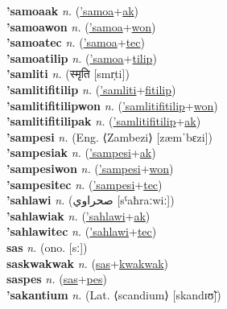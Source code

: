 \textbf{'samoaak} \textit{n.} (\hyperref['samoa]{'samoa}+\hyperref[ak]{ak})
 \label{'samoaak} \\
\textbf{'samoawon} \textit{n.} (\hyperref['samoa]{'samoa}+\hyperref[won]{won})
 \label{'samoawon} \\
\textbf{'samoatec} \textit{n.} (\hyperref['samoa]{'samoa}+\hyperref[tec]{tec})
 \label{'samoatec} \\
\textbf{'samoatilip} \textit{n.} (\hyperref['samoa]{'samoa}+\hyperref[tilip]{tilip})
 \label{'samoatilip} \\
\textbf{'samliti} \textit{n.} ({\devanagari{}स्मृति} [smr̩ti])
 \label{'samliti} \\
\textbf{'samlitifitilip} \textit{n.} (\hyperref['samliti]{'samliti}+\hyperref[fitilip]{fitilip})
 \label{'samlitifitilip} \\
\textbf{'samlitifitilipwon} \textit{n.} (\hyperref['samlitifitilip]{'samlitifitilip}+\hyperref[won]{won})
 \label{'samlitifitilipwon} \\
\textbf{'samlitifitilipak} \textit{n.} (\hyperref['samlitifitilip]{'samlitifitilip}+\hyperref[ak]{ak})
 \label{'samlitifitilipak} \\
\textbf{'sampesi} \textit{n.} (Eng. ⟨Zambezi⟩ [zæmˈbɛzi])
 \label{'sampesi} \\
\textbf{'sampesiak} \textit{n.} (\hyperref['sampesi]{'sampesi}+\hyperref[ak]{ak})
 \label{'sampesiak} \\
\textbf{'sampesiwon} \textit{n.} (\hyperref['sampesi]{'sampesi}+\hyperref[won]{won})
 \label{'sampesiwon} \\
\textbf{'sampesitec} \textit{n.} (\hyperref['sampesi]{'sampesi}+\hyperref[tec]{tec})
 \label{'sampesitec} \\
\textbf{'sahlawi} \textit{n.} ({\arabics{}صحراوي} [sˤaħraːwiː])
 \label{'sahlawi} \\
\textbf{'sahlawiak} \textit{n.} (\hyperref['sahlawi]{'sahlawi}+\hyperref[ak]{ak})
 \label{'sahlawiak} \\
\textbf{'sahlawitec} \textit{n.} (\hyperref['sahlawi]{'sahlawi}+\hyperref[tec]{tec})
 \label{'sahlawitec} \\
\textbf{sas} \textit{n.} (ono. [sː])
 \label{sas} \\
\textbf{saskwakwak} \textit{n.} (\hyperref[sas]{sas}+\hyperref[kwakwak]{kwakwak})
 \label{saskwakwak} \\
\textbf{saspes} \textit{n.} (\hyperref[sas]{sas}+\hyperref[pes]{pes})
 \label{saspes} \\
\textbf{'sakantium} \textit{n.} (Lat. ⟨scandium⟩ [skandɪʊ̃])
